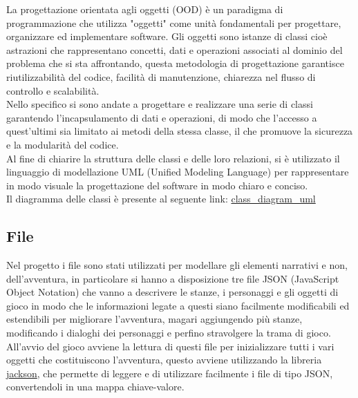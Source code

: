 \documentclass[italian,12pt,a4paper]{article}
\begin{document}
	La progettazione orientata agli oggetti (OOD) è un paradigma di programmazione che utilizza "oggetti" come unità fondamentali per progettare, organizzare ed implementare software. Gli oggetti sono istanze di classi cioè astrazioni che rappresentano concetti, dati e operazioni associati al dominio del problema che si sta affrontando, questa metodologia di progettazione garantisce riutilizzabilità del codice, facilità di manutenzione, chiarezza nel flusso di controllo e scalabilità.\\
	\linebreak
	Nello specifico si sono andate a progettare e realizzare una serie di classi garantendo l'incapsulamento di dati e operazioni, di modo che l'accesso a quest'ultimi sia limitato ai metodi della stessa classe, il che promuove la sicurezza e la modularità del codice.\\
	\linebreak
	Al fine di chiarire la struttura delle classi e delle loro relazioni, si è utilizzato il linguaggio di modellazione UML (Unified Modeling Language) per rappresentare in modo visuale la progettazione del software in modo chiaro e conciso.\\
	\linebreak
	Il diagramma delle classi è presente al seguente link: \href{https://github.com/Giut0/Phosphorus-textual-adventure/blob/main/docs/img/class_diagram.jpeg}{class\_diagram\_uml}
	
	\subsection{File}
	Nel progetto i file sono stati utilizzati per modellare gli elementi narrativi e non, dell'avventura, in particolare si hanno a disposizione tre file JSON (JavaScript Object Notation) che vanno a descrivere le stanze, i personaggi e gli oggetti di gioco in modo che le informazioni legate a questi siano facilmente modificabili ed estendibili per migliorare l'avventura, magari aggiungendo più stanze, modificando i dialoghi dei personaggi e perfino stravolgere la trama di gioco. \\
	\linebreak
	All'avvio del gioco avviene la lettura di questi file per inizializzare tutti i vari oggetti che costituiscono l'avventura, questo avviene utilizzando la libreria \href{https://github.com/FasterXML/jackson}{jackson}, che permette di leggere e di utilizzare facilmente i file di tipo JSON, convertendoli in una mappa chiave-valore.
	
\end{document}
